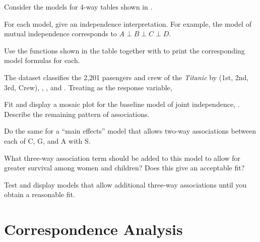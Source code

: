 \documentclass[11pt]{report}\usepackage[]{graphicx}\usepackage[]{color}
\begin{document}
\begin{Exercises}
\exercise Consider the models for 4-way tables shown in . 
  \begin{enumerate*}
    \item For each model, give an independence interpretation.  For example, the model of mutual
    independence corresponds to $A \perp B \perp C \perp D$.
    \item Use the functions shown in the table together with  to print the
    corresponding model formulas for each.
  \end{enumerate*}
  
  \exercise\label{lab:mosaic-titanic} The dataset  classifies the 2,201 pasengers and crew of the \emph{Titanic}
  by  (1st, 2nd, 3rd, Crew), , , and . Treating  as the response variable,
    \begin{enumerate*}
      \item Fit and display a mosaic plot for the baseline model of joint independence, . Describe the remaining
      pattern of associations.
      \item Do the same for a ``main effects'' model that allows two-way associations between each of C, G, and A with S.
      \item What three-way association term should be added to this model to allow for greater survival among women and children?
      Does this give an acceptable fit?
      \item Test and display models that allow additional three-way associations until you obtain a reasonable fit.
    \end{enumerate*}
  
\end{Exercises}


\chapter{Correspondence Analysis}\label{ch:corresp}
\end{document}
